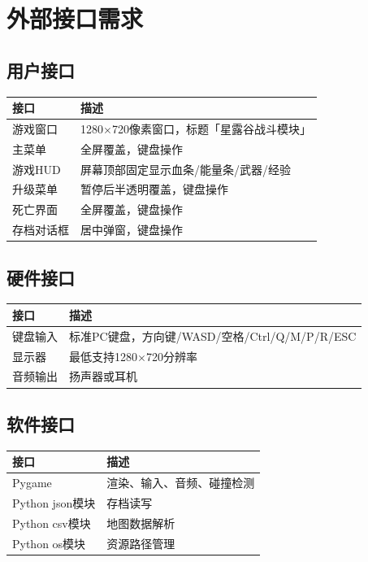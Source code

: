 \documentclass[12pt,a4paper]{article}
\begin{document}
\section{外部接口需求}

\subsection{用户接口}

\begin{table}[htbp]
\centering
\begin{tabularx}{\textwidth}{lX}
\toprule
\textbf{接口} & \textbf{描述} \\
\midrule
游戏窗口 & 1280$\times$720像素窗口，标题「星露谷战斗模块」 \\
主菜单 & 全屏覆盖，键盘操作 \\
游戏HUD & 屏幕顶部固定显示血条/能量条/武器/经验 \\
升级菜单 & 暂停后半透明覆盖，键盘操作 \\
死亡界面 & 全屏覆盖，键盘操作 \\
存档对话框 & 居中弹窗，键盘操作 \\
\bottomrule
\end{tabularx}
\end{table}

\subsection{硬件接口}

\begin{table}[htbp]
\centering
\begin{tabularx}{\textwidth}{lX}
\toprule
\textbf{接口} & \textbf{描述} \\
\midrule
键盘输入 & 标准PC键盘，方向键/WASD/空格/Ctrl/Q/M/P/R/ESC \\
显示器 & 最低支持1280$\times$720分辨率 \\
音频输出 & 扬声器或耳机 \\
\bottomrule
\end{tabularx}
\end{table}

\subsection{软件接口}

\begin{table}[htbp]
\centering
\begin{tabularx}{\textwidth}{lX}
\toprule
\textbf{接口} & \textbf{描述} \\
\midrule
Pygame & 渲染、输入、音频、碰撞检测 \\
Python json模块 & 存档读写 \\
Python csv模块 & 地图数据解析 \\
Python os模块 & 资源路径管理 \\
\bottomrule
\end{tabularx}
\end{table}
\end{document}
